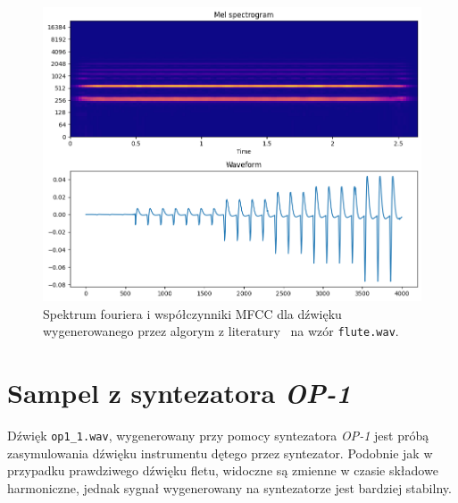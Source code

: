 \begin{multicols}{3}
\begin{figure}[H]
    \centering
    \includegraphics[width=0.9\linewidth]{rys06/macret_evolved_flute.png}
    \caption{
      Spektrum fouriera i współczynniki MFCC dla dźwięku
      wygenerowanego przez algorym z literatury~\cite{evolutionary_puredata}
      na wzór \texttt{flute.wav}.
    }\label{fig:evolved_literature_flute}
\end{figure}
\end{multicols}


\section{Sampel z syntezatora \textit{OP-1}}

Dźwięk \texttt{op1\_1.wav}, wygenerowany przy pomocy syntezatora \textit{OP-1} jest próbą
zasymulowania dźwięku instrumentu dętego przez syntezator. Podobnie jak w przypadku
prawdziwego dźwięku fletu, widoczne są zmienne w czasie składowe harmoniczne, jednak
sygnał wygenerowany na syntezatorze jest bardziej stabilny.

